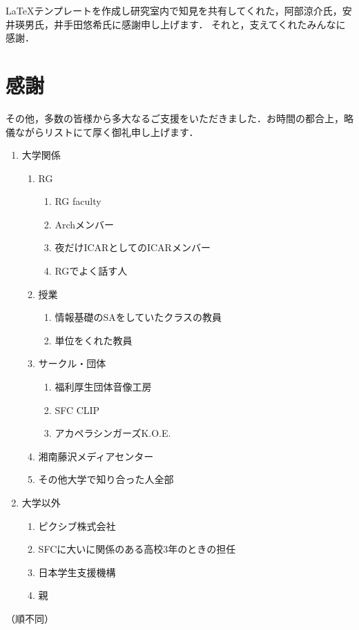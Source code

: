 \begin{acknowledgment}

LaTeXテンプレートを作成し研究室内で知見を共有してくれた，阿部涼介氏，安井瑛男氏，井手田悠希氏に感謝申し上げます．
それと，支えてくれたみんなに感謝．

\section*{感謝}

その他，多数の皆様から多大なるご支援をいただきました．お時間の都合上，略儀ながらリストにて厚く御礼申し上げます．

\begin{enumerate}
  \item 大学関係
  \begin{enumerate}
    \item RG
    \begin{enumerate}
      \item RG faculty
      \item Archメンバー
      \item 夜だけICARとしてのICARメンバー
      \item RGでよく話す人
    \end{enumerate}

    \item 授業
    \begin{enumerate}
      \item 情報基礎のSAをしていたクラスの教員
      \item 単位をくれた教員
    \end{enumerate}

    \item サークル・団体
    \begin{enumerate}
      \item 福利厚生団体音像工房
      \item SFC CLIP
      \item アカペラシンガーズK.O.E.
    \end{enumerate}

    \item 湘南藤沢メディアセンター
    \item その他大学で知り合った人全部
  \end{enumerate}

  \item 大学以外
  \begin{enumerate}
    \item ピクシブ株式会社
    \item SFCに大いに関係のある高校3年のときの担任
    \item 日本学生支援機構
    \item 親
  \end{enumerate}
\end{enumerate}

（順不同）

\end{acknowledgment}
